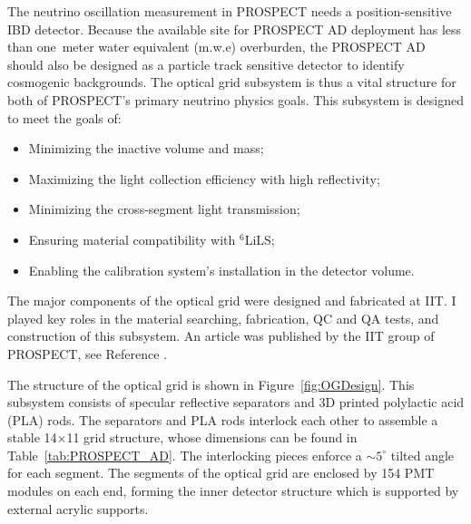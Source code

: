 The neutrino oscillation measurement in PROSPECT needs a position-sensitive IBD detector.
Because the available site for PROSPECT AD deployment has less than one~meter water equivalent (m.w.e) overburden, the PROSPECT AD should also be designed as a particle track sensitive detector to identify cosmogenic backgrounds.
The optical grid subsystem is thus a vital structure for both of PROSPECT's primary neutrino physics goals.
This subsystem is designed to meet the goals of:
\begin{itemize}
	\item Minimizing the inactive volume and mass;
	\item Maximizing the light collection efficiency with high reflectivity;
	\item Minimizing the cross-segment light transmission;
	\item Ensuring material compatibility with $^6$LiLS;
	\item Enabling the calibration system's installation in the detector volume.
\end{itemize}
The major components of the optical grid were designed and fabricated at IIT.
I played key roles in the material searching, fabrication, QC and QA tests, and construction of this subsystem.
An article was published by the IIT group of PROSPECT, see Reference \cite{bib:prospect_og}.

The structure of the optical grid is shown in Figure~\ref{fig:OGDesign}.
This subsystem consists of specular reflective separators and 3D printed polylactic acid (PLA) rods. 
The separators and PLA rods interlock each other to assemble a stable 14$\times$11 grid structure, whose dimensions can be found in Table~\ref{tab:PROSPECT_AD}.
The interlocking pieces enforce a $\sim5^\circ$ tilted angle for each segment.
The segments of the optical grid are enclosed by 154 PMT modules on each end, forming the inner detector structure which is supported by external acrylic supports.

